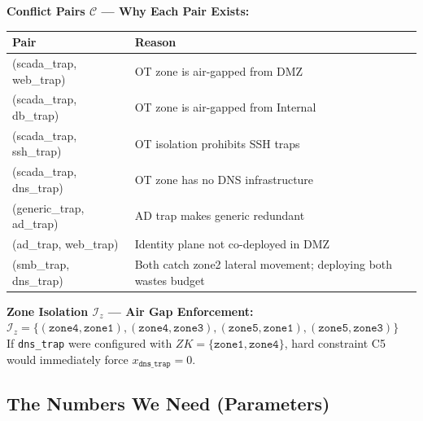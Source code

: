 \documentclass[journal]{IEEEtran}
\newcommand{\calC}{\mathcal{C}}
\begin{document}
\begin{examplebox}
\textbf{Conflict Pairs $\calC$ --- Why Each Pair Exists:}
\begin{center}
\small
\renewcommand{\arraystretch}{1.1}
\begin{tabular}{@{}ll@{}}
\toprule
\textbf{Pair} & \textbf{Reason} \\
\midrule
(scada\_trap, web\_trap)  & OT zone is air-gapped from DMZ \\
(scada\_trap, db\_trap)   & OT zone is air-gapped from Internal \\
(scada\_trap, ssh\_trap)  & OT isolation prohibits SSH traps \\
(scada\_trap, dns\_trap)  & OT zone has no DNS infrastructure \\
(generic\_trap, ad\_trap) & AD trap makes generic redundant \\
(ad\_trap, web\_trap)     & Identity plane not co-deployed in DMZ \\
(smb\_trap, dns\_trap)    & Both catch zone2 lateral movement;
                            deploying both wastes budget \\
\bottomrule
\end{tabular}
\end{center}
\end{examplebox}

\begin{examplebox}
\textbf{Zone Isolation $\mathcal{I}_z$ --- Air Gap
Enforcement:}\\[3pt]
$\mathcal{I}_z = \{(\texttt{zone4},\texttt{zone1}),
(\texttt{zone4},\texttt{zone3}),
(\texttt{zone5},\texttt{zone1}),
(\texttt{zone5},\texttt{zone3})\}$\\[4pt]
If \texttt{dns\_trap} were configured with
$ZK = \{\texttt{zone1},\texttt{zone4}\}$, hard constraint C5
would immediately force $x_{\texttt{dns\_trap}} = 0$.
\end{examplebox}

\subsection{The Numbers We Need (Parameters)}
\end{document}
